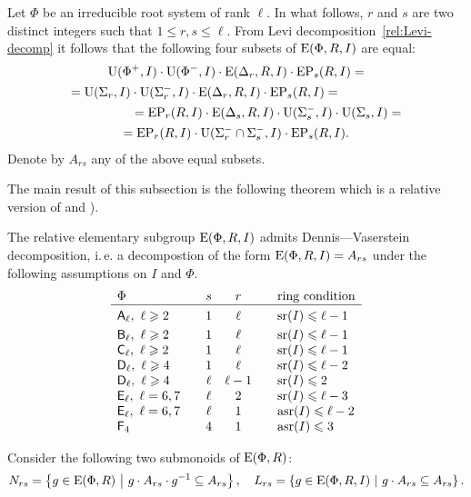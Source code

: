 Let $\Phi$ be an irreducible root system of rank $\ell$.
In what follows, $r$ and $s$ are two distinct integers such that $1 \leq r, s \leq \ell$.
From Levi decomposition~\eqref{rel:Levi-decomp} it follows that the following four subsets of $\operatorname{E}(\Phi, R, I)$ are equal:
\begin{multline*}
\operatorname{U}(\Phi^+, I)\cdot \operatorname{U}(\Phi^-, I) \cdot \operatorname{E}(\Delta_r, R, I) \cdot \operatorname{EP}_s(R, I) = \\
= \operatorname{U}(\Sigma_r, I)\cdot \operatorname{U}(\Sigma^-_r, I) \cdot \operatorname{E}(\Delta_r, R, I) \cdot \operatorname{EP}_s(R, I) = \hspace{5em} \\
\hspace{5em} = \operatorname{EP}_r(R, I) \cdot \operatorname{E}(\Delta_s, R, I) \cdot \operatorname{U}(\Sigma_s^-, I)\cdot \operatorname{U}(\Sigma_s, I) = \\
= \operatorname{EP}_r(R, I) \cdot \operatorname{U}(\Sigma^-_r \cap \Sigma^-_s, I) \cdot \operatorname{EP}_s(R, I).
\end{multline*}
Denote by $A_{rs}$ any of the above equal subsets.

The main result of this subsection is the following theorem which is a relative version of \cite[Lemma~2.1]{ST76} and \cite[Theorem~2.5]{St78}).
\begin{thm}\label{thm:DennisVaserstein}
The relative elementary subgroup $\operatorname{E}(\Phi, R, I)$ admits Dennis---Vaserstein decomposition, i.\,e. a decompostion of the form $\operatorname{E}(\Phi, R, I) = A_{rs}$ under the following assumptions on $I$ and $\Phi$.
\[\begin{array}{l@{\qquad}c@{\quad}c@{\qquad}l}
\Phi                                 & s    & r      & \text{ring condition} \\ \hline\vphantom{\Bigl(}
\rA_\ell,\ \ell\geqslant 2           & 1    & \ell   & \sr(I) \leqslant \ell-1 \\    
\rB_\ell,\ \ell\geqslant 2           & 1    & \ell   & \sr(I) \leqslant \ell-1 \\
\rC_\ell,\ \ell \geqslant 2          & 1    & \ell   & \sr(I) \leqslant \ell-1 \\
\rD_\ell,\ \ell\geqslant 4           & 1    & \ell   & \sr(I) \leqslant \ell-2 \\ 
\rD_\ell,\ \ell\geqslant 4           & \ell & \ell-1 & \sr(I) \leqslant 2      \\
\rE_\ell,\ \ell=6,7                  & \ell & 2      & \sr(I) \leqslant \ell-3 \\ 
\rE_\ell,\ \ell=6,7                  & \ell & 1      & \asr(I)\leqslant \ell-2 \\ 
\rF_4                                & 4    & 1      & \asr(I)\leqslant 3 \end{array}\]
\end{thm}
Consider the following two submonoids of $\operatorname{E}(\Phi, R)$:
\[ N_{rs} = \left\{ g\in \operatorname{E}(\Phi, R)\ \middle|\ g \cdot A_{rs} \cdot g^{-1} \subseteq A_{rs} \right\}, \quad
   L_{rs}=  \left\{ g\in \operatorname{E}(\Phi, R, I)\ \middle|\ g \cdot A_{rs} \subseteq A_{rs} \right\}. \]

